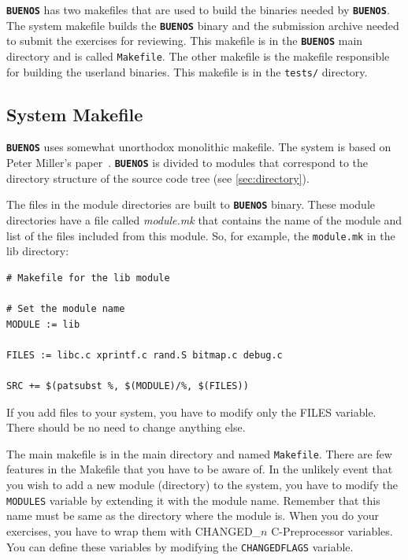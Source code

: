 \documentclass[twoside,a4paper]{report}
\newcommand{\buenos}{\texttt{\textbf{BUENOS}}}
\begin{document}
\buenos{} has two makefiles that are used to build the binaries needed
by \buenos{}. The system makefile builds the \buenos{} binary and the
submission archive needed to submit the exercises for reviewing. This
makefile is in the \buenos{} main directory and is called
\texttt{Makefile}. The other makefile is the makefile responsible for
building the userland binaries. This makefile is in the
\texttt{tests/} directory.

\subsection{System Makefile}

\buenos{} uses somewhat unorthodox monolithic makefile. The system
is based on Peter Miller's paper~\cite{miller}. \buenos{} is divided
to modules that correspond to the directory structure of the source
code tree (see \autoref{sec:directory}).


The files in the module directories are built to \buenos{} binary.
These module directories have a file called \textit{module.mk} that
contains the name of the module and list of the files included from
this module. So, for example, the \texttt{module.mk} in the lib
directory:
\begin{verbatim}
# Makefile for the lib module

# Set the module name
MODULE := lib

FILES := libc.c xprintf.c rand.S bitmap.c debug.c

SRC += $(patsubst %, $(MODULE)/%, $(FILES))
\end{verbatim}

If you add files to your system, you have to modify only the FILES
variable. There should be no need to change anything else.


The main makefile is in the main directory and named
\texttt{Makefile}. There are few features in the Makefile that you
have to be aware of. In the unlikely event that you wish to add a new
module (directory) to the system, you have to modify the
\texttt{MODULES} variable by extending it with the module name.
Remember that this name must be same as the directory where the module
is. When you do your exercises, you have to wrap them with
CHANGED\_$n$ C-Preprocessor variables. You can define these variables
by modifying the \texttt{CHANGEDFLAGS} variable.
\end{document}
